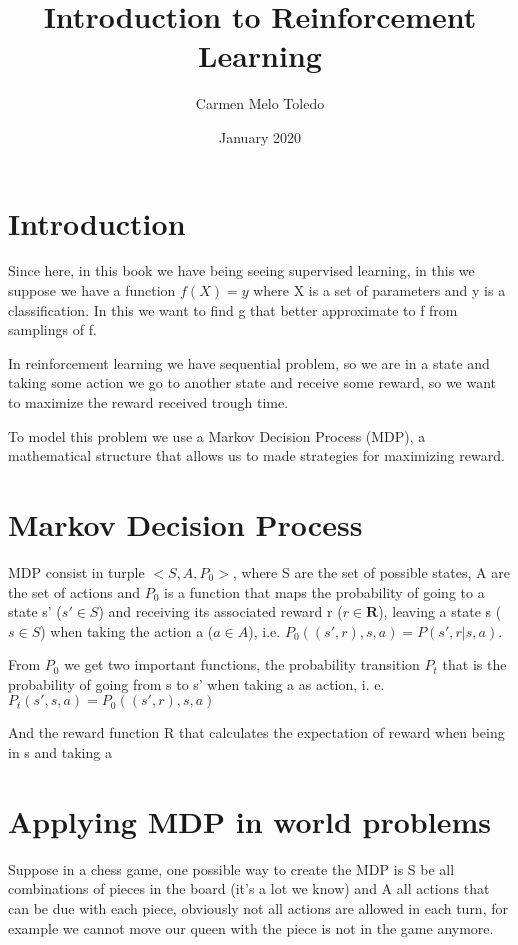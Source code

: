 \documentclass{article}
\title{Introduction to Reinforcement Learning}
\author{Carmen Melo Toledo}
\date{January 2020}
\begin{document}
\maketitle

\section{Introduction}
    Since here, in this book we have being seeing supervised learning, in this we suppose we have a function $f(X)=y$ where X is a set of parameters and y is a classification. In this we want to find g that better approximate to f from samplings of f.
    
    In reinforcement learning we have sequential problem, so we are in a state and taking some action we go to another state and receive some reward, so we want to maximize the reward received trough time.
    
    To model this problem we use a Markov Decision Process (MDP), a mathematical structure that allows us to made strategies for maximizing reward.
     
\section{Markov Decision Process}

MDP consist in turple $<S,A,P_0>$, where S are the set of possible states, A are the set of actions and $P_0$ is a function that maps the probability of going to a state s' ($s' \in S$) and receiving its associated reward r ($r \in \mathbf{R}$), leaving a state s ($s \in S$) when taking the action a ($a \in A$), i.e. $P_0((s',r),s,a)= P(s',r|s,a)$.


From $P_0$ we get two important functions, the probability transition $P_t$ that is the probability of going from s to s' when taking a as action, i. e. $P_t(s',s,a)=P_0((s',r),s,a)$

And the reward function R that calculates the expectation of reward when being in s and taking a

\section{Applying MDP in world problems}

Suppose in a chess game, one possible way to create the MDP is S be all combinations of pieces in the board (it's a lot we know) and A all actions that can be due with each piece, obviously not all actions are allowed in each turn, for example we cannot move our queen with the piece is not in the game anymore.
\end{document}
